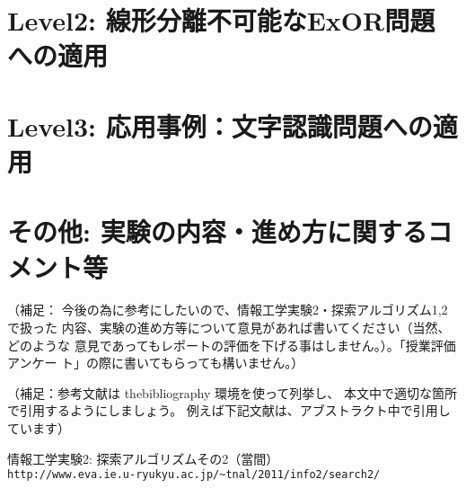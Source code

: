 \documentclass[10pt]{jarticle}
\begin{document}
\newpage

\section{Level2: 線形分離不可能なExOR問題への適用}


\newpage

\section{Level3: 応用事例：文字認識問題への適用}





\newpage
\section{その他: 実験の内容・進め方に関するコメント等}
（補足：
今後の為に参考にしたいので、情報工学実験2・探索アルゴリズム1,2で扱った
内容、実験の進め方等について意見があれば書いてください（当然、どのような
意見であってもレポートの評価を下げる事はしません。）。「授業評価アンケー
ト」の際に書いてもらっても構いません。）


\vspace{+1.0cm}
（補足：参考文献は thebibliography 環境を使って列挙し、
本文中で適切な箇所で引用するようにしましょう。
例えば下記文献は、アブストラクト中で引用しています）
\begin{thebibliography}{99}
情報工学実験2: 探索アルゴリズムその2（當間）\\
\verb|http://www.eva.ie.u-ryukyu.ac.jp/~tnal/2011/info2/search2/|
\end{thebibliography}
\end{document}
